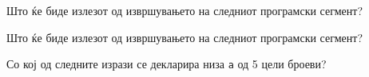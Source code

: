 \documentclass[11pt]{examdesign}
\begin{document}
\begin{multiplechoice}[title={},suppressprefix=yes,rearrange=no]
\begin{question}
Што ќе биде излезот од извршувањето на следниот програмски сегмент?
\end{question}
  
\begin{question}
Што ќе биде излезот од извршувањето на следниот програмски сегмент?
\end{question}
  
\begin{question}
Со кој од следните изрази се декларира низа \texttt{a} од 5 цели броеви?
\end{question}
  
\end{multiplechoice}
\end{document}
